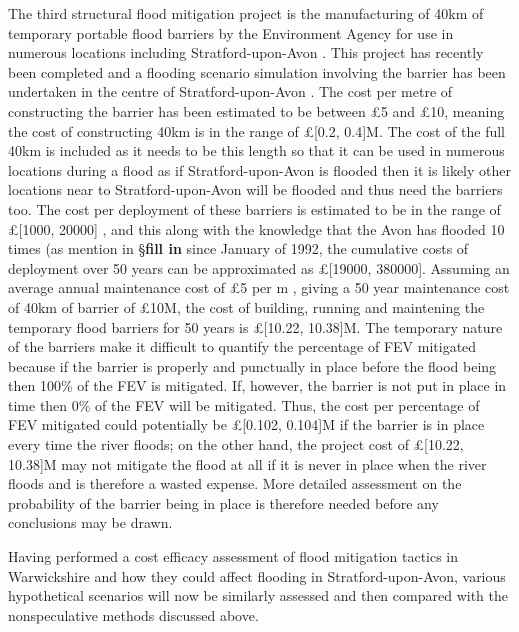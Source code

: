 \documentclass[11pt,a4paper]{article}
\begin{document}
The third structural flood mitigation project is the manufacturing of 40km of temporary portable flood barriers by the Environment Agency for use in numerous locations including Stratford-upon-Avon \cite{lentemp}. This project has recently been completed and a flooding scenario simulation involving the barrier has been undertaken in the centre of Stratford-upon-Avon \cite{strat-flood}. The cost per metre of constructing the barrier has been estimated to be between \pounds5 and \pounds10, meaning the cost of constructing 40km is in the range of \pounds[0.2, 0.4]M. The cost of the full 40km is included as it needs to be this length so that it can be used in numerous locations during a flood as if Stratford-upon-Avon is flooded then it is likely other locations near to Stratford-upon-Avon will be flooded and thus need the barriers too. The cost per deployment of these barriers is estimated to be in the range of \pounds[1000, 20000] \cite{temp}, and this along with the knowledge that the Avon has flooded 10 times (as mention in \S\textbf{fill in} since January of 1992, the cumulative costs of deployment over 50 years can be approximated as \pounds[19000, 380000]. Assuming an average annual maintenance cost of \pounds5 per m \cite{cost1}, giving a 50 year maintenance cost of 40km of barrier of \pounds10M, the cost of building, running and maintening the temporary flood barriers for 50 years is \pounds[10.22, 10.38]M. The temporary nature of the barriers make it difficult to quantify the percentage of FEV mitigated because if the barrier is properly and punctually in place before the flood being then 100\% of the FEV is mitigated. If, however, the barrier is not put in place in time then 0\% of the FEV will be mitigated. Thus, the cost per percentage of FEV mitigated could potentially be \pounds[0.102, 0.104]M if the barrier is in place every time the river floods{;} on the other hand, the project cost of \pounds[10.22, 10.38]M may not mitigate the flood at all if it is never in place when the river floods and is therefore a wasted expense. More detailed assessment on the probability of the barrier being in place is therefore needed before any conclusions may be drawn.

Having performed a cost efficacy assessment of flood mitigation tactics in Warwickshire and how they could affect flooding in Stratford-upon-Avon, various hypothetical scenarios will now be similarly assessed and then compared with the nonspeculative methods discussed above.
\end{document}
